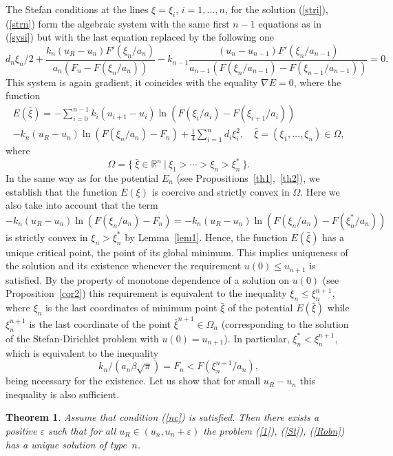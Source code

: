 \documentclass[12pt]{article}
\theoremstyle{plain}
\newtheorem{theorem}{Theorem}[section]
\theoremstyle{definition}
\numberwithin{equation}{section}
\newcommand{\R}{{\mathbb R}}
\begin{document}
The Stefan conditions at the lines $\xi=\xi_i$, $i=1,\ldots,n$, for the solution (\ref{stri}), (\ref{strn}) form the algebraic system with the same first $n-1$ equations as in (\ref{sysi}) but with the last equation replaced by the following one
\[
d_n\xi_n/2+\frac{k_n(u_R-u_n)F'(\xi_n/a_n)}{a_n(F_n-F(\xi_n/a_n))}- k_{n-1}\frac{(u_n-u_{n-1})F'(\xi_n/a_{n-1})}{a_{n-1}(F(\xi_n/a_{n-1})-F(\xi_{n-1}/a_{n-1}))}=0.
\]
This system is again gradient, it coincides with the equality $\nabla E=0$, where the function
\begin{align*}
E(\bar\xi)=-\sum_{i=0}^{n-1}k_i(u_{i+1}-u_i)\ln (F(\xi_i/a_i)-F(\xi_{i+1}/a_i))\nonumber\\
-k_n(u_R-u_n)\ln (F(\xi_n/a_n)-F_n)+\frac{1}{4}\sum_{i=1}^n d_i\xi_i^2, \quad \bar\xi=(\xi_1,\ldots,\xi_n)\in\Omega,
\end{align*}
where
\[\Omega=\{ \ \bar\xi\in\R^n \ | \ \xi_1>\cdots>\xi_n>\xi_n^* \ \}.\]
In the same way as for the potential $E_n$ (see Propositions~\ref{th1},~\ref{th2}), we establish that the function $E(\xi)$
is coercive and strictly convex in $\Omega$. Here we also take into account that the term $-k_n(u_R-u_n)\ln (F(\xi_n/a_n)-F_n)=-k_n(u_R-u_n)\ln (F(\xi_n/a_n)-F(\xi^*_n/a_n))$ is strictly convex in $\xi_n>\xi_n^*$ by Lemma~\ref{lem1}. Hence, the function $E(\bar\xi)$  has a unique critical point, the point of its global minimum.
This implies uniqueness of the solution and its existence whenever the requirement $u(0)\le u_{n+1}$ is satisfied. By the property of monotone dependence of a solution on $u(0)$ (see Proposition~\ref{cor2}) this requirement is equivalent to the inequality $\xi_n\le\xi_n^{n+1}$, where $\xi_n$ is the last coordinates of minimum point $\bar\xi$ of the potential $E(\bar\xi)$ while $\xi_n^{n+1}$ is the last coordinate of the point $\bar\xi^{n+1}\in\Omega_n$ (corresponding to the solution of the Stefan-Dirichlet problem with $u(0)=u_{n+1}$). In particular, $\xi^*_n<\xi_n^{n+1}$, which is equivalent to the inequality
\begin{equation}\label{nc}
k_n/(a_n\beta\sqrt{\pi})=F_n<F(\xi_n^{n+1}/a_n),
\end{equation}
being necessary for the existence. Let us show that for small $u_R-u_n$ this inequality is also sufficient.

\begin{theorem}\label{th7}
Assume that condition (\ref{nc}) is satisfied. Then there exists a positive $\varepsilon$ such that for all $u_R\in (u_n,u_n+\varepsilon)$ the problem (\ref{1}), (\ref{St}), (\ref{Robn}) has a unique solution of type~$n$.
\end{theorem}
\end{document}
